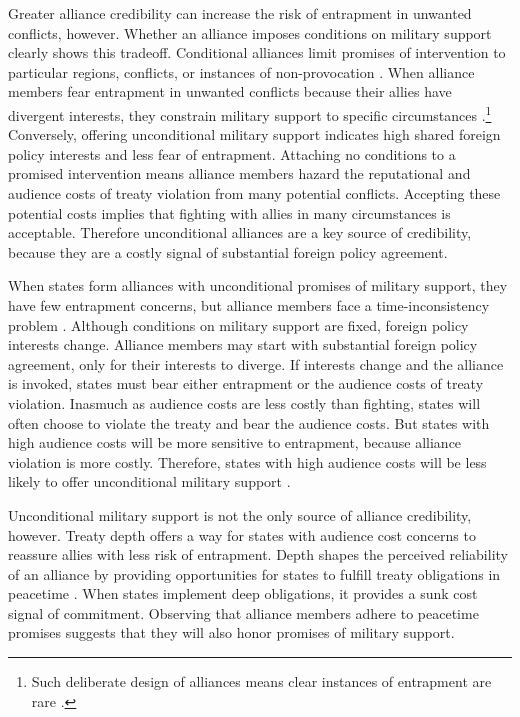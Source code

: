 \documentclass[12pt]{article}
\begin{document}
Greater alliance credibility can increase the risk of entrapment in unwanted conflicts, however. 
Whether an alliance imposes conditions on military support clearly shows this tradeoff.
Conditional alliances limit promises of intervention to particular regions, conflicts, or instances of non-provocation \citep{Leedsetal2000}. 
When alliance members fear entrapment in unwanted conflicts because their allies have divergent interests, they constrain military support to specific circumstances \citep{Kim2011, Benson2012}.\footnote{Such deliberate design of alliances means clear instances of entrapment are rare \citep{Kim2011, Beckley2015}.} 
Conversely, offering unconditional military support indicates high shared foreign policy interests and less fear of entrapment. 
Attaching no conditions to a promised intervention means alliance members hazard the reputational \citep{Gibler2008, Crescenzietal2012} and audience \citep{Fearon1997} costs of treaty violation from many potential conflicts. 
Accepting these potential costs implies that fighting with allies in many circumstances is acceptable.
Therefore unconditional alliances are a key source of credibility, because they are a costly signal of substantial foreign policy agreement. 


When states form alliances with unconditional promises of military support, they have few entrapment concerns, but alliance members face a time-inconsistency problem \citep{LeedsSavun2007}. 
Although conditions on military support are fixed, foreign policy interests change. 
Alliance members may start with substantial foreign policy agreement, only for their interests to diverge.
If interests change and the alliance is invoked, states must bear either entrapment or the audience costs of treaty violation.
Inasmuch as audience costs are less costly than fighting, states will often choose to violate the treaty and bear the audience costs.   
But states with high audience costs will be more sensitive to entrapment, because alliance violation is more costly. 
Therefore, states with high audience costs will be less likely to offer unconditional military support  \citep{Chibaetal2015}. 


Unconditional military support is not the only source of alliance credibility, however. 
Treaty depth offers a way for states with audience cost concerns to reassure allies with less risk of entrapment. 
Depth shapes the perceived reliability of an alliance by providing opportunities for states to fulfill treaty obligations in peacetime \citep{Morrow1994}. 
When states implement deep obligations, it provides a sunk cost signal of commitment.
Observing that alliance members adhere to peacetime promises suggests that they will also honor promises of military support. 
\end{document}
